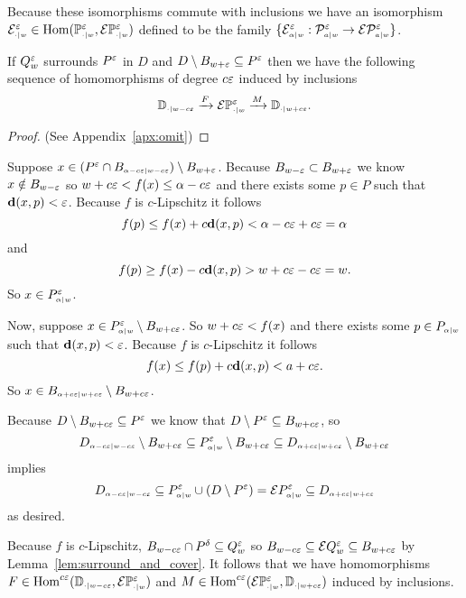   Because these isomorphisms commute with inclusions we have an isomorphism $\E\subi{w}{\cdot}^\e \in \Hom(\PP{w}{\e},\ext{\PP{w}{\e}})$ defined to be the family $\{\E\subi{w}{\alpha}^\e : \P{w}{\e}{a}\to \E\P{w}{\e}{a}\}$.
\endproofatend

\begin{lemma}\label{lem:p_interleave}
 If $Q_w^\e$ surrounds $P^\e$ in $D$ and $D\setminus B_{w + \e}\subseteq P^\e$ then we have the following sequence of homomorphisms of degree $c\e$ induced by inclusions
 \[\DD{w-c\e}\xrightarrow{F}\E\PP{w}{\e}\xrightarrow{M}\DD{w+c\e}.\]
\end{lemma}
\begin{proof}
  (See Appendix~\ref{apx:omit})
\end{proof}
\proofatend
  Suppose $x\in (P^\e\cap B\subi{w-c\e}{\alpha-c\e})\setminus B_{w+\e}$.
  Because $B_{w-\e}\subset B_{w+\e}$ we know $x\notin B_{w-\e}$ so $w+c\e < f(x)\leq \alpha-c\e$ and there exists some $p\in P$ such that $\dist(x, p) < \e$.
  Because $f$ is $c$-Lipschitz it follows
  \[ f(p)\leq f(x) + c\dist(x, p) < \alpha - c\e + c\e = \alpha\]
  and
  \[ f(p)\geq f(x) - c\dist(x, p) > w+c\e-c\e = w.\]
  So $x\in P\subi{w}{\alpha}^\e$.

  Now, suppose $x\in P\subi{w}{\alpha}^\e\setminus B_{w+c\e}$.
  So $w+c\e < f(x)$ and there exists some $p\in P\subi{w}{\alpha}$ such that $\dist(x,p) < \e$.
  Because $f$ is $c$-Lipschitz it follows
  \[ f(x) \leq f(p) + c\dist(x,p) < a + c\e.\]
  So $x\in B\subi{w+c\e}{\alpha+c\e}\setminus B_{w+c\e}$.

  Because $D\setminus B_{w+c\e}\subseteq P^\e$ we know that $D\setminus P^\e \subseteq B_{w+c\e}$, so
  \[D\subi{w-c\e}{\alpha-c\e}\setminus B_{w+c\e} \subseteq P\subi{w}{\alpha}^\e\setminus B_{w+c\e}\subseteq D\subi{w+c\e}{\alpha+c\e}\setminus B_{w+c\e}\]
  implies
  \[ D\subi{w-c\e}{\alpha-c\e}\subseteq P\subi{w}{\alpha}^\e\cup (D\setminus P^\e) = \ext{P\subi{w}{\alpha}^\e} \subseteq D\subi{w+c\e}{\alpha+c\e} \]
  as desired.

  Because $f$ is $c$-Lipschitz, $B_{w-c\e}\cap P^\delta\subseteq Q_{w}^\e$ so $B_{w-c\e} \subseteq \E Q_w^\e\subseteq B_{w+c\e}$ by Lemma~\ref{lem:surround_and_cover}.
  It follows that we have homomorphisms $F\in \Hom^{c\e}(\DD{w-c\e}, \E\PP{w}{\e})$ and $M\in\Hom^{c\e}(\E\PP{w}{\e}, \DD{w+c\e})$ induced by inclusions.
\endproofatend
